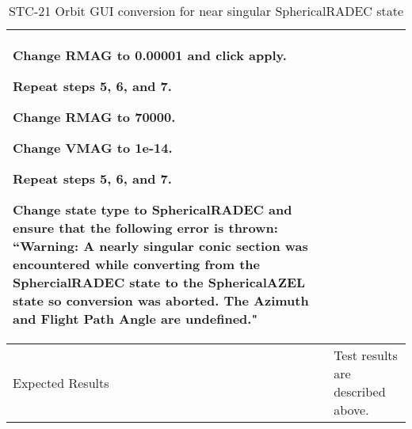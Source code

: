 \begin{table}[htbp!]
\begin{tabular}{|p{1.05 in} |p{4.75 in} |}
\begin{compactenum}
                 \item Change RMAG to 0.00001 and click apply.
                 \item Repeat steps 5, 6, and 7.
                 \item Change RMAG to 70000.
                 \item Change VMAG to 1e-14.
                 \item Repeat steps 5, 6, and 7.
                 \item Change state type to SphericalRADEC and ensure that the following error is thrown: ``Warning: A nearly singular conic section was encountered while converting from the SphercialRADEC state to the SphericalAZEL state so conversion was aborted.  The Azimuth and Flight Path Angle are undefined."
         \end{compactenum}
         \\ \hline
         Expected Results & Test results are described above.\\
      \hline
      \end{tabular}
      \label{Table:STC-21}
      \caption{STC-21 Orbit GUI conversion for near singular SphericalRADEC state}
\end{table} 

